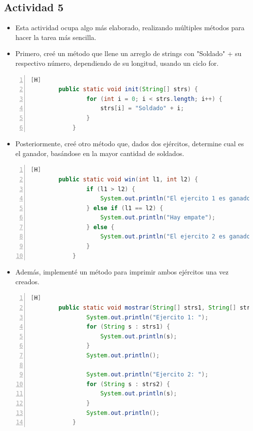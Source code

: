 \documentclass{article}
\begin{document}
	\subsection{Actividad 5}
	\begin{itemize}
		\item Esta actividad ocupa algo más elaborado, realizando múltiples métodos para hacer la tarea más sencilla.
		\item Primero, creé un método que llene un arreglo de strings con "Soldado" + su respectivo número, dependiendo de su longitud, usando un ciclo for.
	\end{itemize}
	\begin{lstlisting}[language=java,caption={Método para inicializar los arreglos de soldados}, numbers=left][H]
		public static void init(String[] strs) {
        		for (int i = 0; i < strs.length; i++) {
            		strs[i] = "Soldado" + i;
        		}
    		}
	\end{lstlisting}
	\begin{itemize}
		\item Posteriormente, creé otro método que, dados dos ejércitos, determine cual es el ganador, basándose en la mayor cantidad de soldados.
	\end{itemize}
	\begin{lstlisting}[language=java,caption={Método para declarar al ganador}, numbers=left][H]
		public static void win(int l1, int l2) {
        		if (l1 > l2) {
            		System.out.println("El ejercito 1 es ganador");
        		} else if (l1 == l2) {
            		System.out.println("Hay empate");
        		} else {
            		System.out.println("El ejercito 2 es ganador");
        		}
    		}		
	\end{lstlisting}	
	\begin{itemize}
		\item Además, implementé un método para imprimir ambos ejércitos una vez creados.
	\end{itemize}
	\begin{lstlisting}[language=java,caption={Método para imprimir ambos arreglos(ejércitos)}, numbers=left][H]
		public static void mostrar(String[] strs1, String[] strs2) {
        		System.out.println("Ejercito 1: ");
        		for (String s : strs1) {
            		System.out.println(s);
        		}
        		System.out.println();

        		System.out.println("Ejercito 2: ");
        		for (String s : strs2) {
            		System.out.println(s);
        		}
        		System.out.println();
    		}	
	\end{lstlisting}
\end{document}
